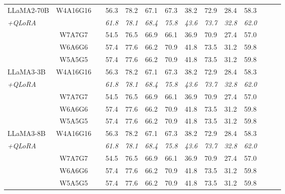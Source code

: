 \begin{table*}[!t]
{{\begin{tabular}{lcccccccccccc|c}
\midrule
 LLaMA2-70B         & \multirow{2}{*}{W4A16G16} & &56.3 & 78.2 & 67.1 & 67.3 & 38.2 & 72.9 & 28.4 & 58.3 \\
 \textit{+QLoRA} &  & & \textit{61.8} & \textit{78.1} & \textit{68.4} & \textit{75.8} & \textit{43.6} & \textit{73.7} & \textit{32.8} & \textit{62.0} \\
\noalign{\vspace{0.1em}}\hdashline[0.8pt/1pt]\noalign{\vspace{0.1em}}
 \multirow{4}{*}{W/ GSQ-Tuning} & W7A7G7  & & 54.5 & 76.5 & 66.9 & 66.1 & 36.9 & 70.9 & 27.4 & 57.0 \\
 & W6A6G6 & & 57.4 & 77.6 & 66.2 & 70.9 & 41.8 & 73.5 & 31.2 & 59.8 \\
& W5A5G5 & & 57.4 & 77.6 & 66.2 & 70.9 & 41.8 & 73.5 & 31.2 & 59.8 \\
\midrule
 LLaMA3-3B         & \multirow{2}{*}{W4A16G16}& &56.3 & 78.2 & 67.1 & 67.3 & 38.2 & 72.9 & 28.4 & 58.3 \\
 \textit{+QLoRA} &  & & \textit{61.8} & \textit{78.1} & \textit{68.4} & \textit{75.8} & \textit{43.6} & \textit{73.7} & \textit{32.8} & \textit{62.0} \\
\noalign{\vspace{0.1em}}\hdashline[0.8pt/1pt]\noalign{\vspace{0.1em}}
 \multirow{4}{*}{W/ GSQ-Tuning} & W7A7G7  & & 54.5 & 76.5 & 66.9 & 66.1 & 36.9 & 70.9 & 27.4 & 57.0 \\
 & W6A6G6 & & 57.4 & 77.6 & 66.2 & 70.9 & 41.8 & 73.5 & 31.2 & 59.8 \\
& W5A5G5 & & 57.4 & 77.6 & 66.2 & 70.9 & 41.8 & 73.5 & 31.2 & 59.8 \\
\midrule
 LLaMA3-8B         & \multirow{2}{*}{W4A16G16} & &56.3 & 78.2 & 67.1 & 67.3 & 38.2 & 72.9 & 28.4 & 58.3 \\
 \textit{+QLoRA} &  & & \textit{61.8} & \textit{78.1} & \textit{68.4} & \textit{75.8} & \textit{43.6} & \textit{73.7} & \textit{32.8} & \textit{62.0} \\
\noalign{\vspace{0.1em}}\hdashline[0.8pt/1pt]\noalign{\vspace{0.1em}}
 \multirow{4}{*}{W/ GSQ-Tuning} & W7A7G7  & & 54.5 & 76.5 & 66.9 & 66.1 & 36.9 & 70.9 & 27.4 & 57.0 \\
 & W6A6G6 & & 57.4 & 77.6 & 66.2 & 70.9 & 41.8 & 73.5 & 31.2 & 59.8 \\
& W5A5G5 & & 57.4 & 77.6 & 66.2 & 70.9 & 41.8 & 73.5 & 31.2 & 59.8 \\
\bottomrule
\end{tabular}}}
\end{table*}